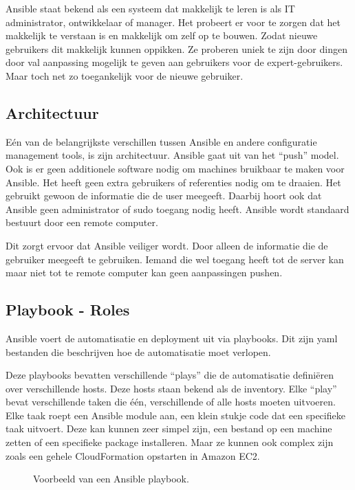 Ansible staat bekend als een systeem dat makkelijk te leren is als IT administrator, ontwikkelaar of manager. Het probeert er voor te zorgen dat het makkelijk te verstaan is en makkelijk om zelf op te bouwen. Zodat nieuwe gebruikers dit makkelijk kunnen oppikken. Ze proberen uniek te zijn door dingen door val aanpassing mogelijk te geven aan gebruikers voor de expert-gebruikers. Maar toch net zo toegankelijk voor de nieuwe gebruiker.

\subsection{Architectuur}
Eén van de belangrijkste verschillen tussen Ansible en andere configuratie management tools, is zijn architectuur. Ansible gaat uit van het ``push'' model. Ook is er geen additionele software nodig om machines bruikbaar te maken voor Ansible. Het heeft geen extra gebruikers of referenties nodig om te draaien. Het gebruikt gewoon de informatie die de user meegeeft. Daarbij hoort ook dat Ansible geen administrator of sudo toegang nodig heeft. Ansible wordt standaard bestuurt door een remote computer.

Dit zorgt ervoor dat Ansible veiliger wordt. Door alleen de informatie die de gebruiker meegeeft te gebruiken. Iemand die wel toegang heeft tot de server kan maar niet tot te remote computer kan geen aanpassingen pushen.

\subsection{Playbook - Roles}
Ansible voert de automatisatie en deployment uit via playbooks. Dit zijn yaml bestanden die beschrijven hoe de automatisatie moet verlopen. 

Deze playbooks bevatten verschillende ``plays'' die de automatisatie definiëren over verschillende hosts. Deze hosts staan bekend als de inventory. Elke ``play'' bevat verschillende taken die één, verschillende of alle hosts moeten uitvoeren. Elke taak roept een Ansible module aan, een klein stukje code dat een specifieke taak uitvoert. Deze kan kunnen zeer simpel zijn, een bestand op een machine zetten of een specifieke package installeren. Maar ze kunnen ook complex zijn zoals een gehele CloudFormation opstarten in Amazon EC2.
\begin{figure}[!htb]
    \caption{Voorbeeld van een Ansible playbook.}
    \label{fig:playbook}
\end{figure}

